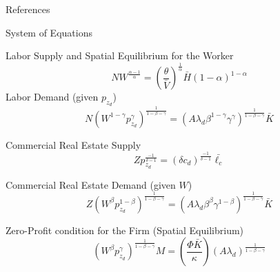 \documentclass[11pt]{beamer}
\begin{document}
\begin{frame}{References}
\nocite{*}

\end{frame}




\begin{frame}{System of Equations}

Labor Supply and Spatial Equilibrium for the Worker
$$N W^\frac{\alpha - 1}{\alpha} = \left(\frac{\theta}{\bar{V}}\right)^\frac{1}{\alpha} \bar{H} (1-\alpha)^{1-\alpha}$$
Labor Demand (given $p_{z_d}$)
$$N\left( W^{1-\gamma} p_{z_d}^{\gamma}\right)^\frac{1}{1-\beta-\gamma} = \left( A\lambda_d \beta^{1-\gamma} \gamma^\gamma\right)^\frac{1}{1-\beta-\gamma} \bar{K} $$

Commercial Real Estate Supply
$$Z p_{z_d}^\frac{-1}{\delta - 1} = \left(\delta c_d \right)^\frac{-1}{\delta -1} \bar{\ell_c} $$

Commercial Real Estate Demand (given $W$)
$$Z\left(W^\beta p_{z_d}^{1-\beta}\right)^\frac{1}{1-\beta-\gamma} = \left( A\lambda_d \beta^\beta \gamma^{1-\beta}\right)^\frac{1}{1-\beta-\gamma} \bar{K}$$

Zero-Profit condition for the Firm (Spatial Equilibrium)
$$\left( W^\beta p_{z_d}^\gamma \right)^\frac{1}{1-\beta-\gamma} M = \left(\frac{\Phi \bar{K}}{\kappa}\right) (A \lambda_d )^\frac{1}{1-\beta-\gamma}$$

\end{frame}
\end{document}
